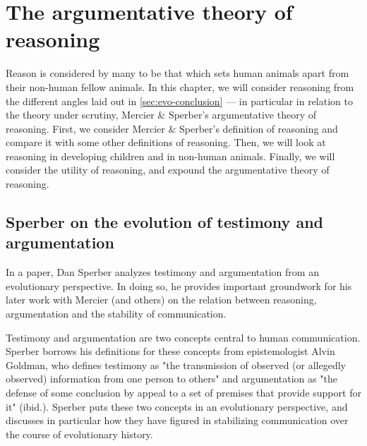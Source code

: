 \chapter{The argumentative theory of reasoning}
\label{ch:atr}

Reason is considered by many to be that which sets human animals apart from their non-human fellow animals. In this chapter, we will consider reasoning from the different angles laid out in \cref{sec:evo-conclusion} --- in particular in relation to the theory under scrutiny, Mercier \& Sperber's argumentative theory of reasoning. First, we consider Mercier \& Sperber's definition of reasoning and compare it with some other definitions of reasoning. Then, we will look at reasoning in developing children and in non-human animals. Finally, we will consider the utility of reasoning, and expound the argumentative theory of reasoning.

\section{Sperber on the evolution of testimony and argumentation}
\label{sec:Sperber01}

In a \citeyear{Sperber01} paper, Dan Sperber analyzes testimony and argumentation from an evolutionary perspective. In doing so, he provides important groundwork for his later work with Mercier (and others) on the relation between reasoning, argumentation and the stability of communication.

Testimony and argumentation are two concepts central to human communication. Sperber borrows his definitions for these concepts from epistemologist Alvin Goldman, who defines testimony as "the transmission of observed (or allegedly observed) information from one person to others" \citep[p.~401]{Sperber01} and argumentation as "the defense of some conclusion by appeal to a set of premises that provide support for it" (ibid.).
Sperber puts these two concepts in an evolutionary perspective, and discusses in particular how they have figured in stabilizing communication over the course of evolutionary history.


